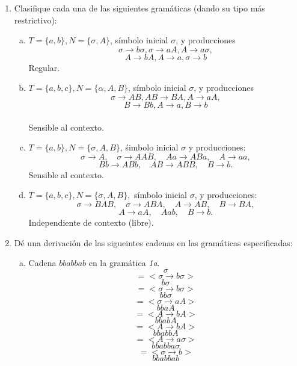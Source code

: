 \documentclass{article}
\begin{document}
\begin{enumerate}[1.]
\item
Clasifique cada una de las siguientes gramáticas (dando su tipo más restrictivo):
  \begin{enumerate}[a)]
    \item
      $T = \{ a,b\}, N = \{ \sigma, A\}$, símbolo inicial $\sigma$, y producciones
      \[ \sigma \rightarrow b\sigma, \sigma \rightarrow aA, A \rightarrow a\sigma,\]
      \[ A \rightarrow bA, A \rightarrow a, \sigma \rightarrow b\]
      Regular.
    \item 
      $T = \{ a,b,c \}, N = \{ \alpha,A,B\}$, símbolo inicial $\sigma$, y producciones
      \[ \sigma \rightarrow AB, AB \rightarrow BA, A \rightarrow aA,\]
      \[ B \rightarrow Bb, A \rightarrow a, B \rightarrow b\] \\
       Sensible al contexto.
    \item
      $T = \{ a,b\}, N = \{ \sigma, A,B\}$, śimbolo inicial $\sigma$ y producciones:
      \[ \sigma \rightarrow A, \quad \sigma \rightarrow AAB,\quad Aa \rightarrow ABa, \quad A \rightarrow aa,\]
      \[ Bb \rightarrow ABb, \quad AB \rightarrow ABB, \quad B \rightarrow b.\]
      Sensible al contexto.
    \item
      $T = \{ a,b,c \}, N = \{\sigma,A,B \},$ símbolo inicial $\sigma$, y producciones:
      \[ \sigma \rightarrow BAB, \quad \sigma \rightarrow ABA, \quad A \rightarrow AB, \quad B \rightarrow BA,\]
      \[A \rightarrow aA, \quad A ab, \quad B \rightarrow b.\]
      Independiente de contexto (libre).
  \end{enumerate}
\item
  Dé una derivación de las sigueintes cadenas en las gramáticas especificadas:
    \begin{enumerate}[a)]
      \item 
        Cadena $bbabbab$ en la gramática \textit{1a}.
        \[ \sigma \]
        \[ = < \sigma \rightarrow b\sigma >\]
        \[ b\sigma \]
        \[ = < \sigma \rightarrow b\sigma > \]
        \[ bb\sigma \]
        \[ = < \sigma \rightarrow aA > \]
        \[ bbaA \]
        \[ = < A \rightarrow bA > \]
        \[ bbabA \]
        \[ = < A \rightarrow bA > \]
        \[ bbabbA \]
        \[ = <A \rightarrow a\sigma> \]
        \[ bbabba\sigma\]
        \[ = <\sigma \rightarrow b> \]
        \[ bbabbab\]
    \end{enumerate}
\end{enumerate}
\end{document}
